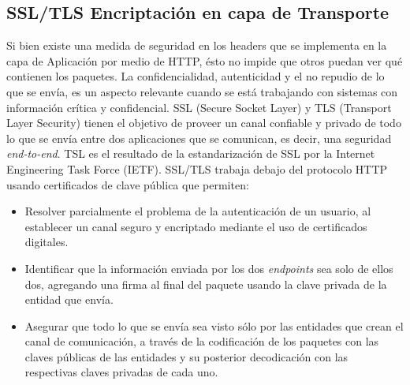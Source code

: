     \subsection{SSL/TLS Encriptación en capa de Transporte}
    Si bien existe una medida de seguridad en los headers que se implementa en la capa de Aplicación por medio de HTTP, ésto no impide que otros puedan ver qué contienen los paquetes. La confidencialidad, autenticidad y el no repudio de lo que se envía, es un aspecto relevante cuando se está trabajando con sistemas con información crítica y confidencial. SSL (Secure Socket Layer) y TLS (Transport Layer Security) tienen el objetivo de proveer un canal confiable y privado de todo lo que se envía entre dos aplicaciones que se comunican, es decir, una seguridad \textit{end-to-end}. TSL es el resultado de la estandarización de SSL por la Internet Engineering Task Force (IETF). SSL/TLS trabaja debajo del protocolo HTTP usando certificados de clave pública que permiten:
    \begin{itemize}
        \item Resolver parcialmente el problema de la autenticación de un usuario, al establecer un canal seguro y encriptado mediante el uso de certificados digitales.
        \item Identificar que la información enviada por los dos \textit{endpoints} sea solo de ellos dos, agregando una firma al final del paquete usando la clave privada de la entidad que envía.
        \item Asegurar que todo lo que se envía sea visto sólo por las entidades que crean el canal de comunicación, a través de la codificación de los paquetes con las claves públicas de las entidades y su posterior decodicación con las respectivas claves privadas de cada uno.
    \end{itemize}

